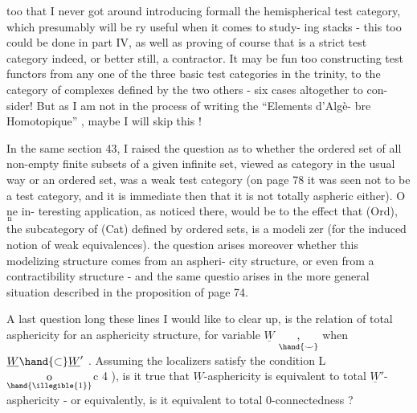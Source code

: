 
too that I never got around introducing formall the hemispherical test
category, which presumably will be ry useful when it comes to study-%
ing stacks - this too could be done in part IV, as well as proving
of course that \hand{$\bigcirc$} is a strict test category indeed, or better still,
a contractor. It may be fun too constructing test functors from any
one of the three basic test categories in the trinity, to the category
of complexes defined by the two others - six cases altogether to con-%
sider! But as I am not in the process of writing the ``Elements d'Algè-%
bre Homotopique'' , maybe I will skip this !

In the same section 43, I raised the question as to whether the
ordered set of all non-empty finite subsets of a given infinite set,
viewed as  category in the usual way or an ordered set, was a weak
test category (on page 78 it was seen not to be a test category, and
it is immediate then that it is not totally aspheric either). O\(\underset{\text{n}}{\text{n}}\)e in-%
teresting application, as noticed there, would be to the effect that
(Ord), the subcategory of (Cat) defined by ordered sets, is a modeli%
zer (for the induced notion of weak equivalences).  the question
arises moreover whether this modelizing structure comes from an aspheri-%
city structure, or even from a contractibility structure - and the
same questio arises in the more general situation described in the
proposition of page 74.

A last question long these lines I would like to clear up,
is the relation of total asphericity for an asphericity structure,
for variable $\underline{W}$ \(\underset{\hand{\smile}}{\text{,}}\) when $\underline{W} \hand{\subset} \underline{W}'$ . Assuming the localizers satisfy
the condition L\(\underset{\hand{\illegible{1}}}{\text{o}}\)c 4 ), is it true that  $\underline{W}$-asphericity is equivalent
to total $\underline{W}'$-asphericity -  or equivalently, is it equivalent
to total 0-connectedness ?

